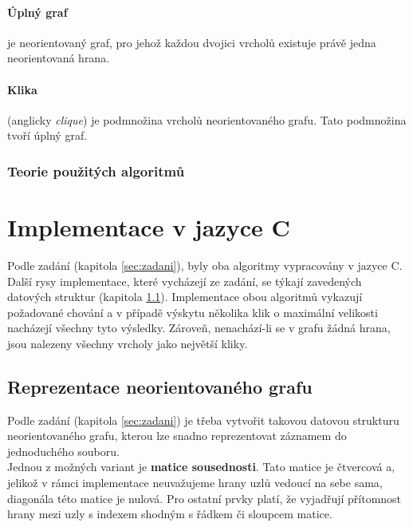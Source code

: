 \documentclass[a4paper]{article}
\begin{document}
            \paragraph{Úplný graf} je neorientovaný graf, pro jehož každou dvojici vrcholů existuje právě jedna neorientovaná hrana.\cite{slu_zaklad-teo-grafu}
            
            \paragraph{Klika} (anglicky \textit{clique}) je podmnožina vrcholů neorientovaného grafu. Tato podmnožina tvoří úplný graf.\cite{cliq-definition}
    
        \subsubsection{Teorie použitých algoritmů}

\section{Implementace v jazyce C}  \label{sec:implem}
    Podle zadání (kapitola \ref{sec:zadani}), byly oba algoritmy vypracovány v jazyce C. Další rysy implementace, které vycházejí ze zadání, se týkají zavedených datových struktur (kapitola \ref{subsec:graph_imp}). Implementace obou algoritmů vykazují požadované chování a v případě výskytu několika klik o maximální velikosti nacházejí všechny tyto výsledky. Zároveň, nenachází-li se v grafu žádná hrana, jsou nalezeny všechny vrcholy jako největší kliky.\\

    \subsection{Reprezentace neorientovaného grafu} \label{subsec:graph_imp}
        Podle zadání (kapitola \ref{sec:zadani}) je třeba vytvořit takovou datovou strukturu neorientovaného grafu, kterou lze snadno reprezentovat záznamem do jednoduchého souboru.\\

        \noindent
        Jednou z možných variant je \textbf{matice sousednosti}. Tato matice je čtvercová a, jelikož v rámci implementace neuvažujeme hrany uzlů vedoucí na sebe sama, diagonála této matice je nulová. Pro ostatní prvky platí, že vyjadřují přítomnost hrany mezi uzly s indexem shodným s řádkem či sloupcem matice.\\
\end{document}
